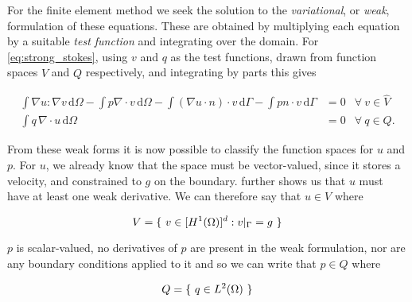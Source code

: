 \documentclass[thesis]{subfiles}
\begin{document}

For the finite element method we seek the solution to the \textit{variational}, or \textit{weak}, formulation of these equations.
These are obtained by multiplying each equation by a suitable \textit{test function} and integrating over the domain.
For \cref{eq:strong_stokes}, using $v$ and $q$ as the test functions, drawn from function spaces $\hat V$ and $Q$ respectively, and integrating by parts this gives

\begin{subequations}
  \begin{align}
    \int \nabla u : \nabla v \, \textrm{d}\Omega
    - \int p \nabla \cdot v \, \textrm{d}\Omega
    - \int (\nabla u \cdot n) \cdot v \, \textrm{d}\Gamma
    - \int p n \cdot v \, \textrm{d}\Gamma
    &= 0
    &\forall \ v \in \hat V
    \label{eq:weak_stokes_extra_V} \\
    \int q \, \nabla \cdot u \, \textrm{d}\Omega
    &= 0
    &\forall \ q \in Q.
    \label{eq:weak_stokes_extra_Q}
  \end{align}
  \label{eq:weak_stokes_extra}
\end{subequations}

From these weak forms it is now possible to classify the function spaces for $u$ and $p$.
For $u$, we already know that the space must be vector-valued, since it stores a velocity, and constrained to $g$ on the boundary.
 further shows us that $u$ must have at least one weak derivative.
We can therefore say that $u \in V$ where

\begin{equation}
  V = \{ \ v \in [H^1(\Omega)]^d : v |_{\Gamma} = g \ \}  \\
  \label{eq:stokes_velocity_space}
\end{equation}

$p$ is scalar-valued, no derivatives of $p$ are present in the weak formulation, nor are any boundary conditions applied to it and so we can write that $p \in Q$ where

\begin{equation}
  Q = \{ \ q \in L^2(\Omega) \ \}  \\
  \label{eq:stokes_pressure_space}
\end{equation}
\end{document}
